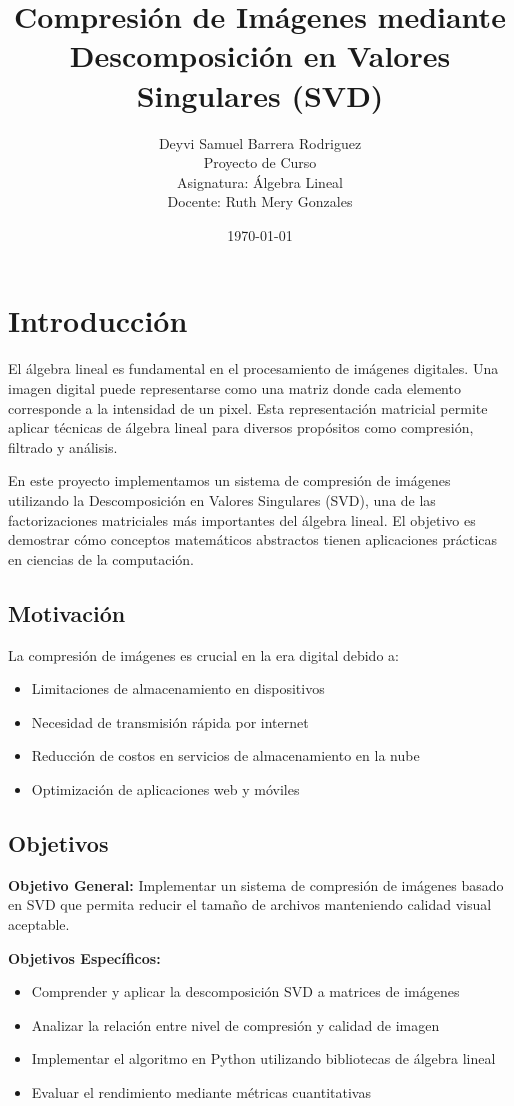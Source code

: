 \documentclass[12pt,a4paper]{article}
\title{\textbf{Compresión de Imágenes mediante\\Descomposición en Valores Singulares (SVD)}}
\author{Deyvi Samuel Barrera Rodriguez\\
	\small Proyecto de Curso\\
	\small Asignatura: Álgebra Lineal\\
	\small Docente: Ruth Mery Gonzales}
\date{\today}
\begin{document}
	
	\maketitle
	\newpage
	
	\tableofcontents
	\newpage
	
	\section{Introducción}
	
	El álgebra lineal es fundamental en el procesamiento de imágenes digitales. Una imagen digital puede representarse como una matriz donde cada elemento corresponde a la intensidad de un pixel. Esta representación matricial permite aplicar técnicas de álgebra lineal para diversos propósitos como compresión, filtrado y análisis.
	
	En este proyecto implementamos un sistema de compresión de imágenes utilizando la Descomposición en Valores Singulares (SVD), una de las factorizaciones matriciales más importantes del álgebra lineal. El objetivo es demostrar cómo conceptos matemáticos abstractos tienen aplicaciones prácticas en ciencias de la computación.
	
	\subsection{Motivación}
	
	La compresión de imágenes es crucial en la era digital debido a:
	\begin{itemize}
		\item Limitaciones de almacenamiento en dispositivos
		\item Necesidad de transmisión rápida por internet
		\item Reducción de costos en servicios de almacenamiento en la nube
		\item Optimización de aplicaciones web y móviles
	\end{itemize}
	
	\subsection{Objetivos}
	
	\textbf{Objetivo General:} Implementar un sistema de compresión de imágenes basado en SVD que permita reducir el tamaño de archivos manteniendo calidad visual aceptable.
	
	\textbf{Objetivos Específicos:}
	\begin{itemize}
		\item Comprender y aplicar la descomposición SVD a matrices de imágenes
		\item Analizar la relación entre nivel de compresión y calidad de imagen
		\item Implementar el algoritmo en Python utilizando bibliotecas de álgebra lineal
		\item Evaluar el rendimiento mediante métricas cuantitativas
	\end{itemize}
	
\end{document}
